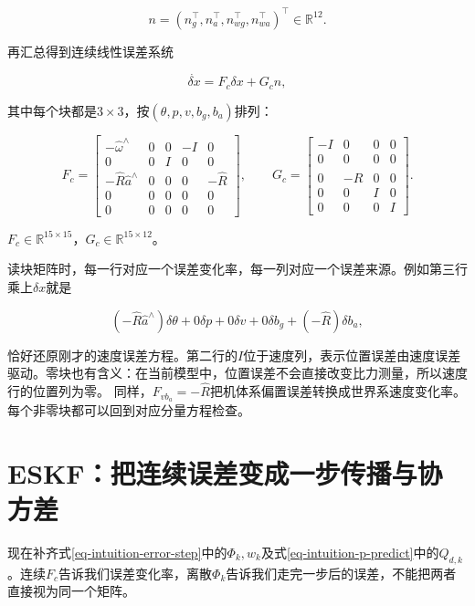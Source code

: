 \begin{equation*}
n=(n_g^\top,n_a^\top,n_{wg}^\top,n_{wa}^\top)^\top\in\mathbb R^{12}.
\end{equation*}

再汇总得到连续线性误差系统

\begin{equation}\label{eq-eskf-linear-system}
\dot{\delta x}=F_c\delta x+G_cn,
\end{equation}

其中每个块都是$3\times3$，按$(\theta,p,v,b_g,b_a)$排列：

\begin{equation*}
F_c=\begin{bmatrix}
 -\hat\omega^\wedge&0&0&-I&0\\
 0&0&I&0&0\\
 -\hat R\hat a^\wedge&0&0&0&-\hat R\\
 0&0&0&0&0\\
 0&0&0&0&0
 \end{bmatrix},\qquad
 G_c=\begin{bmatrix}
 -I&0&0&0\\
 0&0&0&0\\
 0&-\hat R&0&0\\
 0&0&I&0\\
 0&0&0&I
 \end{bmatrix}.
\end{equation*}

$F_c\in\mathbb R^{15\times15}$，$G_c\in\mathbb R^{15\times12}$。

读块矩阵时，每一行对应一个误差变化率，每一列对应一个误差来源。例如第三行乘上$\delta x$就是

\begin{equation*}
(-\hat R\hat a^\wedge)\delta\theta
 +0\delta p+0\delta v+0\delta b_g+(-\hat R)\delta b_a,
\end{equation*}

恰好还原刚才的速度误差方程。第二行的$I$位于速度列，表示位置误差由速度误差驱动。零块也有含义：在当前模型中，位置误差不会直接改变比力测量，所以速度行的位置列为零。 同样，$F_{vb_a}=-\hat R$把机体系偏置误差转换成世界系速度变化率。每个非零块都可以回到对应分量方程检查。

\section{ESKF：把连续误差变成一步传播与协方差}

现在补齐式\eqref{eq-intuition-error-step}中的$\Phi_k,w_k$及式\eqref{eq-intuition-p-predict}中的$Q_{d,k}$。连续$F_c$告诉我们误差变化率，离散$\Phi_k$告诉我们走完一步后的误差，不能把两者直接视为同一个矩阵。

